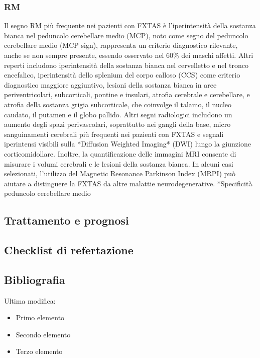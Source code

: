 \subsubsection{RM}
Il segno RM più frequente nei pazienti con FXTAS è l'iperintensità della sostanza bianca nel peduncolo cerebellare medio (MCP), noto come segno del peduncolo cerebellare medio (MCP sign), rappresenta un criterio diagnostico rilevante, anche se non sempre presente, essendo osservato nel 60\% dei maschi affetti. Altri reperti includono iperintensità della sostanza bianca nel cervelletto e nel tronco encefalico, iperintensità dello splenium del corpo calloso (CCS) come criterio diagnostico maggiore aggiuntivo, lesioni della sostanza bianca in aree periventricolari, subcorticali, pontine e insulari, atrofia cerebrale e cerebellare, e atrofia della sostanza grigia subcorticale, che coinvolge il talamo, il nucleo caudato, il putamen e il globo pallido. Altri segni radiologici includono un aumento degli spazi perivascolari, soprattutto nei gangli della base, micro sanguinamenti cerebrali più frequenti nei pazienti con FXTAS e segnali iperintensi visibili sulla *Diffusion Weighted Imaging* (DWI) lungo la giunzione corticomidollare. Inoltre, la quantificazione delle immagini MRI consente di misurare i volumi cerebrali e le lesioni della sostanza bianca. In alcuni casi selezionati, l'utilizzo del Magnetic Resonance Parkinson Index (MRPI) può aiutare a distinguere la FXTAS da altre malattie neurodegenerative.
*Specificità peduncolo cerebellare medio

\subsection{Trattamento e prognosi}

\subsection{Checklist di refertazione}

\subsection{Bibliografia}
\small{
	
	
}

{\tiny Ultima modifica: \filemodprintdate{\jobname}}


\begin{itemize}[label=$\square$] %
	\item Primo elemento
	\item Secondo elemento
	\item Terzo elemento
\end{itemize}